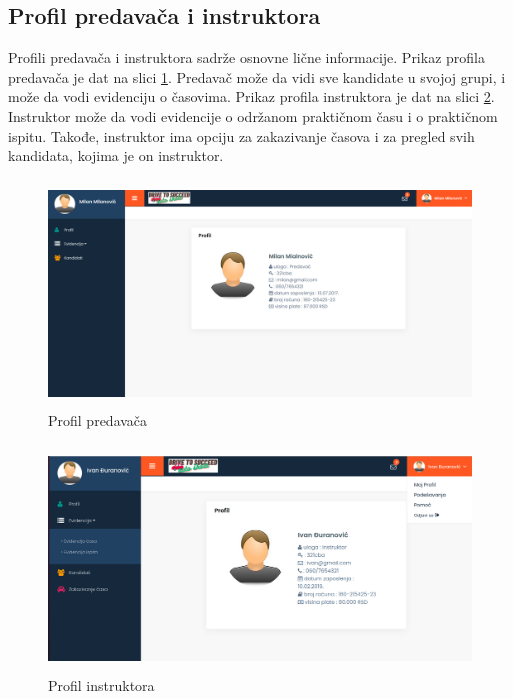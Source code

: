 \subsection{Profil predavača i instruktora}

Profili predavača i instruktora sadrže osnovne lične informacije. 
Prikaz profila predavača je dat na slici \ref{fig:ui_predavač}. 
Predavač može da vidi sve kandidate u svojoj grupi, i može da vodi evidenciju o časovima. 
Prikaz profila instruktora je dat na slici \ref{fig:ui_instruktor}. Instruktor može da vodi evidencije o održanom praktičnom času i o praktičnom ispitu. 
Takođe, instruktor ima opciju za zakazivanje časova i za pregled svih kandidata, kojima je on instruktor.

\begin{figure}[H]
  \begin{center}
      \includegraphics[width=140mm, height=60mm]{UI/UI_Predavac.png}
  \end{center}
  \caption {Profil predavača}
  \label{fig:ui_predavač}

\end{figure}

\begin{figure}[H]
  \begin{center}
      \includegraphics[width=140mm, height=60mm]{UI/UI_profil_instruktora.png}
  \end{center}
  \caption {Profil instruktora}
  \label{fig:ui_instruktor}

\end{figure}
